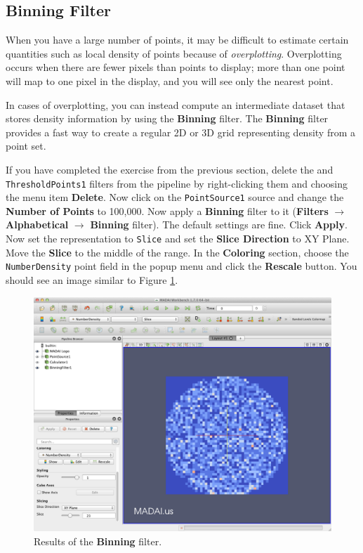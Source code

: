 \documentclass[12pt]{article}
\newcommand{\filter}[1]{\textbf{#1}}
\newcommand{\filterinstance}[1]{\texttt{#1}}
\newcommand{\menu}[1]{\textbf{#1}}
\newcommand{\representation}[1]{\texttt{#1}}
\newcommand{\setting}[1]{\textbf{#1}}
\newcommand{\field}[1]{\texttt{#1}}
\begin{document}
\subsection{Binning Filter}

When you have a large number of points, it may be difficult to estimate certain quantities such as local density of points because of \emph{overplotting}. Overplotting occurs when there are fewer pixels than points to display; more than one point will map to one pixel in the display, and you will see only the nearest point.

In cases of overplotting, you can instead compute an intermediate dataset that stores density information by using the \filter{Binning} filter. The \filter{Binning} filter provides a fast way to create a regular 2D or 3D grid representing density from a point set.

If you have completed the exercise from the previous section, delete the and \filterinstance{ThresholdPoints1} filters from the pipeline by right-clicking them and choosing the menu item \menu{Delete}. Now click on the \filterinstance{PointSource1} source and change the \setting{Number of Points} to 100,000. Now apply a \filter{Binning} filter to it (\menu{Filters} $\rightarrow$ \menu{Alphabetical} $\rightarrow$ \menu{Binning} filter). The default settings are fine. Click \setting{Apply}. Now set the representation to \representation{Slice} and set the \setting{Slice Direction} to XY Plane. Move the \setting{Slice} to the middle of the range. In the \setting{Coloring} section, choose the \field{NumberDensity} point field in the popup menu and click the \setting{Rescale} button. You should see an image similar to Figure \ref{fig:BinningFilter}.

\begin{figure}[htbp]
   \centering
   \includegraphics[scale=.25]{images/BinningFilter.png} %
   \caption{Results of the \filter{Binning} filter.}
   \label{fig:BinningFilter}
\end{figure}
\end{document}
